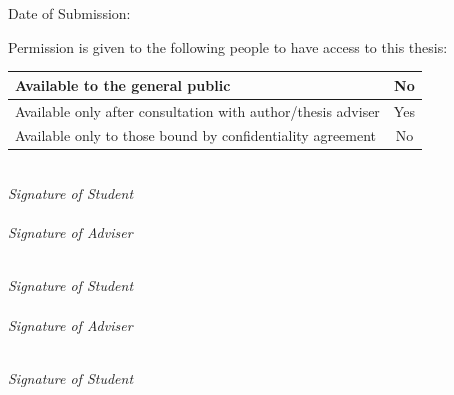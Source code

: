 \documentclass[a4paper, 12pt]{report}
\begin{document}
	\begin{center}\ssp
		Date of Submission: \vspace{0.25em}
		
		\datesubmission
	\end{center}
	\vfill
	\begin{center}  
		\dsp
		Permission is given to the following people to have access to this thesis: \vspace{0.25em}
		
		\begin{tabular}{|l|c|}\hline
			Available to the general public & No\\\hline
			Available only after consultation with author/thesis adviser \qquad & Yes\\\hline
			Available only to those bound by confidentiality agreement & No\\\hline
		\end{tabular}
	\end{center}
	\vspace{30 pt}
    \ifauthortwo
        \ifcoadvised
        	\begin{minipage}{.48\textwidth}\centering
        	\underline{\hspace{5 cm}}\\	
        	\textit{Signature of Student}\\
        	\vspace{15 pt}	
        	\underline{\hspace{5 cm}}\\
        	\textit{Signature of Adviser}\\
        	\end{minipage}%
        	\begin{minipage}{.48\textwidth}\centering
        	\underline{\hspace{5 cm}}\\	
        	\textit{Signature of Student}\\
        	\vspace{15 pt}	
        	\underline{\hspace{5 cm}}\\
        	\textit{Signature of Adviser}\\
        	\end{minipage}
        \else	
            \begin{minipage}{.48\textwidth}\centering
        	\underline{\hspace{5 cm}}\\	
        	\textit{Signature of Student}\\
        	\vspace{20 pt}
        	\end{minipage}%
\end{document}
